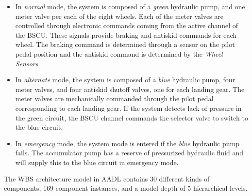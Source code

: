 \begin{itemize}
	\renewcommand{\labelitemi}{\textbullet}
	\item In \textit{normal} mode, the system is composed of a \textit{green} hydraulic pump, and one meter valve per each of the eight wheels. Each of the meter valves are controlled through electronic commands coming from the active channel of the BSCU. These signals provide braking and antiskid commands for each wheel. The braking command is determined through a sensor on the pilot pedal position and the antiskid command is determined by the \textit{Wheel Sensors}. 
	\item In \textit{alternate} mode, the system is composed of a \textit{blue} hydraulic pump, four meter valves, and four antiskid shutoff valves, one for each landing gear. The meter valves are mechanically commanded through the pilot pedal corresponding to each landing gear. If the system detects lack of pressure in the green circuit, the BSCU channel commands the selector valve to switch to the blue circuit. 
	\item In \textit{emergency} mode, the system mode is entered if the \textit{blue} hydraulic pump fails. The accumulator pump has a reserve of pressurized hydraulic fluid and will supply this to the blue circuit in emergency mode. 
\end{itemize}

The WBS architecture model in AADL contains 30 different kinds of components, 169 component instances, and a model depth of 5 hierarchical levels. 





